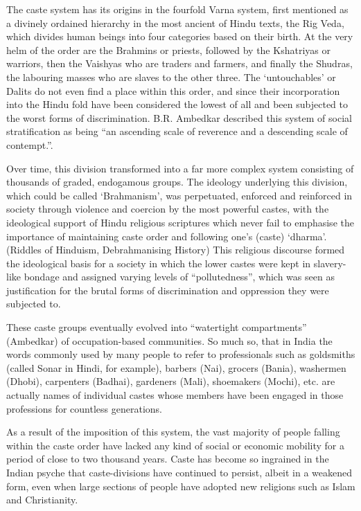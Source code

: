 \documentclass[]{article}
\begin{document}
The caste system has its origins in the fourfold Varna system, first
mentioned as a divinely ordained hierarchy in the most ancient of Hindu
texts, the Rig Veda, which divides human beings into four categories
based on their birth. At the very helm of the order are the Brahmins or
priests, followed by the Kshatriyas or warriors, then the Vaishyas who
are traders and farmers, and finally the Shudras, the labouring masses
who are slaves to the other three. The `untouchables' or Dalits do not
even find a place within this order, and since their incorporation into
the Hindu fold have been considered the lowest of all and been subjected
to the worst forms of discrimination. B.R. Ambedkar described this
system of social stratification as being ``an ascending scale of
reverence and a descending scale of contempt.''.

Over time, this division transformed into a far more complex system
consisting of thousands of graded, endogamous groups. The ideology
underlying this division, which could be called `Brahmanism', was
perpetuated, enforced and reinforced in society through violence and
coercion by the most powerful castes, with the ideological support of
Hindu religious scriptures which never fail to emphasise the importance
of maintaining caste order and following one's (caste) `dharma'.
(Riddles of Hinduism, Debrahmanising History) This religious discourse
formed the ideological basis for a society in which the lower castes
were kept in slavery-like bondage and assigned varying levels of
``pollutedness'', which was seen as justification for the brutal forms
of discrimination and oppression they were subjected to.

These caste groups eventually evolved into ``watertight compartments''
(Ambedkar) of occupation-based communities. So much so, that in India
the words commonly used by many people to refer to professionals such as
goldsmiths (called Sonar in Hindi, for example), barbers (Nai), grocers
(Bania), washermen (Dhobi), carpenters (Badhai), gardeners (Mali),
shoemakers (Mochi), etc. are actually names of individual castes whose
members have been engaged in those professions for countless
generations.

As a result of the imposition of this system, the vast majority of
people falling within the caste order have lacked any kind of social or
economic mobility for a period of close to two thousand years. Caste has
become so ingrained in the Indian psyche that caste-divisions have
continued to persist, albeit in a weakened form, even when large
sections of people have adopted new religions such as Islam and
Christianity.
\end{document}
